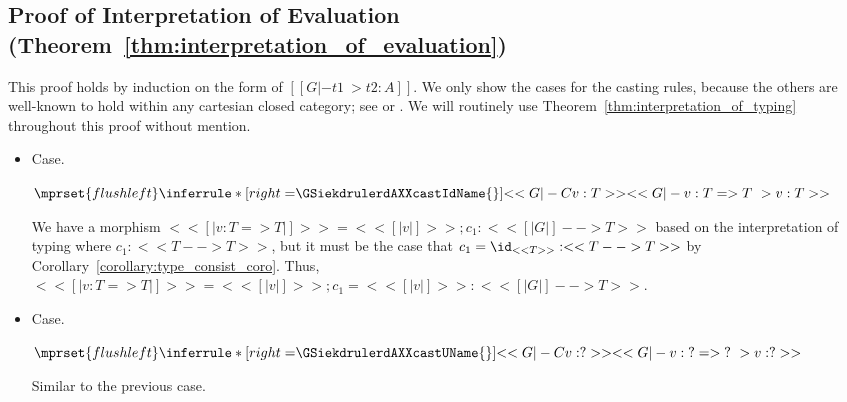\subsection{Proof of Interpretation of Evaluation (Theorem~\ref{thm:interpretation_of_evaluation})}
\label{subsec:proof_of_interpretation_of_evaluation}
This proof holds by induction on the form of $[[G |- t1 ~> t2 : A]]$.
We only show the cases for the casting rules, because the others are
well-known to hold within any cartesian closed category; see
\cite{Lambek:1980} or \cite{Crole:1994}.  We will routinely use
Theorem~\ref{thm:interpretation_of_typing} throughout this proof
without mention.

\begin{itemize}
\item[] Case.\ \\ 
  \begin{center}
    \begin{math}
      $$\mprset{flushleft}
      \inferrule* [right=$\GSiekdrulerdAXXcastIdName{}$] {
        <<G |-C v : T>>
      }{<<G |- v : {T} => {T} ~> v : T>>}
    \end{math}
  \end{center}
  We have a morphism $<< [| v : {T} => {T} |] >> = << [| v |] >> ; c_1 : << [| G |] --> T>>$
  based on the interpretation of typing where $c_1 : << T --> T >>$, but it must be the
  case that $c_1 = \id_{<<T>>} : <<T --> T>>$ by Corollary~\ref{corollary:type_consist_coro}.
  Thus, $<< [| v : {T} => {T} |] >> = << [| v |] >> ; c_1  = << [| v |] >> : << [| G |] --> T>>$.

\item[] Case.\ \\ 
  \begin{center}
    \begin{math}
      $$\mprset{flushleft}
      \inferrule* [right=$\GSiekdrulerdAXXcastUName{}$] {
        <<G |-C v : ?>>
      }{<<G |- v : {?} => {?} ~> v : ?>>}
    \end{math}
  \end{center}
  Similar to the previous case.


\end{itemize}
